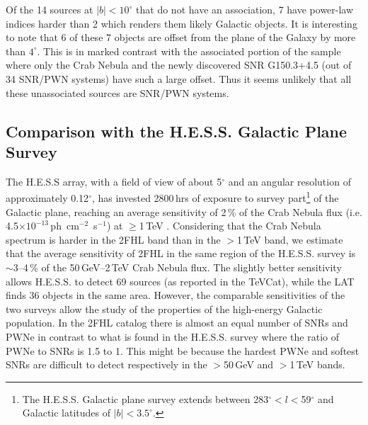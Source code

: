 Of the 14 sources at $|b|<10^{\circ}$ that do not have an
association, 7 have power-law indices harder than 2
which renders them  likely Galactic objects.
It is interesting to note that { 6 of these 7 objects} are offset from the plane of the Galaxy  by more than $4^{\circ}$. This is in marked contrast with the 
associated portion of the sample where only the Crab Nebula and the
newly discovered SNR G150.3+4.5 (out of 34 SNR/PWN systems) have such
a large offset. Thus it seems unlikely that all these unassociated sources
are SNR/PWN systems.

%
%

\subsection{Comparison with the H.E.S.S. Galactic Plane Survey}\label{2fhl:HESS}
The H.E.S.S array, with a field of view of about 5$^{\circ}$ and an angular resolution of approximately 0.12$^\circ$, has invested 2800\,hrs of exposure to survey  part\footnote{The H.E.S.S. Galactic plane survey extends between 283$^{\circ}<l<$59$^{\circ}$ and Galactic latitudes of $|b|<3.5^{\circ}$.} 
of the Galactic plane, reaching an average sensitivity of 2\,\% of the Crab Nebula flux (i.e. 4.5$\times10^{-13}$\,ph~cm$^{-2}$~s$^{-1}$) at $\geq$1\,TeV \citep{aharonian06_gps,carrigan2013}. Considering that the Crab Nebula spectrum is harder
in the 2FHL band than in the $>$1\,TeV band, we estimate that the average sensitivity of 2FHL in the same region of the H.E.S.S. survey is $\sim$3--4\,\% of the { 50\,GeV--2\,TeV Crab Nebula flux.} The slightly better sensitivity 
allows H.E.S.S. to detect 69 sources (as reported in the TeVCat), while
the LAT finds 36 objects in the same area. However, the comparable sensitivities of the two surveys allow the study of the  properties of the high-energy Galactic population.
In the 2FHL catalog there is almost an equal number of SNRs and PWNe
in contrast to what is found in the  H.E.S.S. survey where the ratio
of PWNe to SNRs is 1.5 to 1. This might be because
the hardest PWNe and softest SNRs { are difficult to detect} respectively
in the $>$50\,GeV and $>$1\,TeV bands.


